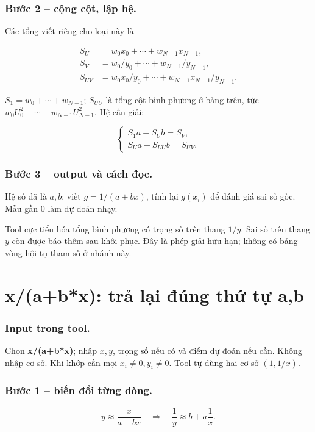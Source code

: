 \subsubsection*{Bước 2 -- cộng cột, lập hệ.} Các tổng viết riêng cho loại này là

\begin{align*}S_U&=w_0x_0+\cdots+w_{N-1}x_{N-1},\\S_V&=w_0/y_0+\cdots+w_{N-1}/y_{N-1},\\S_{UV}&=w_0x_0/y_0+\cdots+w_{N-1}x_{N-1}/y_{N-1}.\end{align*}

$S_1=w_0+\cdots+w_{N-1}$; $S_{UU}$ là tổng cột bình phương ở bảng trên, tức $w_0U_0^2+\cdots+w_{N-1}U_{N-1}^2$. Hệ cần giải:

\[\boxed{\begin{cases}S_1a+S_Ub=S_V,\\S_Ua+S_{UU}b=S_{UV}.\end{cases}}\]

\subsubsection*{Bước 3 -- output và cách đọc.} Hệ số đã là $a,b$; viết $g=1/(a+bx)$, tính lại $g(x_i)$ để đánh giá sai số gốc. Mẫu gần 0 làm dự đoán nhạy.

Tool cực tiểu hóa tổng bình phương có trọng số trên thang $1/y$. Sai số trên thang $y$ còn được báo thêm sau khôi phục. Đây là phép giải hữu hạn; không có bảng vòng hội tụ tham số ở nhánh này.

\examplebreak
\section{x/(a+b*x): trả lại đúng thứ tự a,b}

\label{sec:ls-rational}

\subsubsection*{Input trong tool.} Chọn \textbf{x/\allowbreak{}(a+b*x)}; nhập $x,y$, trọng số nếu có và điểm dự đoán nếu cần. Không nhập cơ sở. Khi khớp cần mọi $x_i\ne0,y_i\ne0$. Tool tự dùng hai cơ sở $(1,1/x)$.

\subsubsection*{Bước 1 -- biến đổi từng dòng.}\[y\approx\frac{x}{a+bx}\quad\Longrightarrow\quad\frac1y\approx b+a\frac1x.\]

